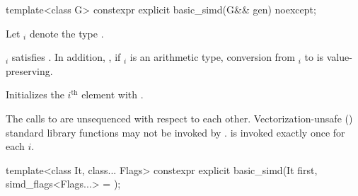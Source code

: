 \begin{itemdecl}
template<class G> constexpr explicit basic_simd(G&& gen) noexcept;
\end{itemdecl}

\begin{itemdescr}
  \pnum Let $_i$ denote the type
  .

  \pnum\constraints
  $_i$ satisfies  \foralli.
  In addition, \foralli, if $_i$ is an arithmetic type, conversion from
  $_i$ to  is value-preserving.

  \pnum\effects
  Initializes the $i^\text{th}$ element with
   \foralli.

  \pnum
    The calls to  are unsequenced with respect to each other.
    Vectorization-unsafe () standard library
    functions may not be invoked by .
     is invoked exactly once for each $i$.

\end{itemdescr}

\newcommand\SimdLoadDescr[2]{
  \pnum\constraints
  \begin{itemize}
    \item \tcode{iter_value_t<It>} is a vectorizable type, and
    \item \tcode{It} models \tcode{contiguous_iterator}.
  \end{itemize}

  \pnum\mandates
  \conversionFlagsMandate{iter_value_t<It>}{value_type}

  \pnum\expects
  \begin{itemize}
    \item #1
    \flagsRequires{basic_simd, iter_value_t<It>}{iter_value_t<It>}
  \end{itemize}

  \pnum\effects #2
}

\begin{itemdecl}
template<class It, class... Flags>
  constexpr explicit basic_simd(It first, simd_flags<Flags...> = {});
\end{itemdecl}

